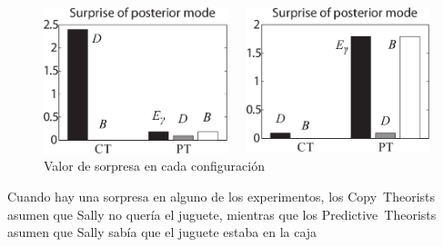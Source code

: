 \documentclass{beamer}
\begin{document}
\begin{frame}
\begin{figure}
\begin{columns}
\begin{column}{.5\textwidth}
\includegraphics[width=\textwidth]{imagenes/surprise_posterior_standard.png}
\end{column}
\begin{column}{.5\textwidth}
\includegraphics[width=\textwidth]{imagenes/surprise_posterior_psychic.png}
\end{column}
\end{columns}
\caption{Valor de sorpresa en cada configuración}
\end{figure}

\vspace{-2em}

Cuando hay una sorpresa en alguno de los experimentos, los Copy~Theorists asumen que Sally no quería el juguete, mientras que los Predictive~Theorists asumen que Sally sabía que el juguete estaba en la caja

\end{frame}
\end{document}
